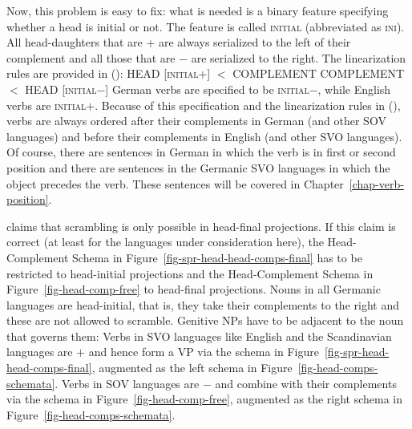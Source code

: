 Now, this problem is easy to fix: what is needed is a binary feature specifying whether a head is
initial or not. The feature is called \textsc{initial} (abbreviated as \textsc{ini}). All
head-daughters that are \ini{}+ are always serialized to the left of their complement and all those
that are \ini{}$-$ are serialized to the right. The linearization rules are provided in ():
\eal
\label{lp-regeln}
\ex HEAD [\textsc{initial}+] $<$ COMPLEMENT
\ex COMPLEMENT $<$  HEAD [\textsc{initial}$-$]
\zl
German verbs are specified to be \textsc{initial}$-$, while English verbs are
\textsc{initial}$+$. Because of this specification and the linearization rules in (), verbs
are always ordered after their complements in German (and other SOV languages) and before their
complements in English (and other SVO languages). Of course, there are sentences in German in which
the verb is in first or second position and there are sentences in the Germanic SVO languages in
which the object precedes the verb. These sentences will be covered in
Chapter~\ref{chap-verb-position}.


\citet[]{Haider2020a} claims that scrambling is only possible in
head-final projections. If this claim is correct (at least for the
languages under consideration here), the Head-Complement Schema in Figure~\ref{fig-spr-head-head-comps-final} has to
be restricted to head-initial projections and the Head-Complement Schema in Figure~\ref{fig-head-comp-free} to
head-final projections. Nouns in all Germanic languages are head-initial, that is, they take their
complements to the right and these are not allowed to scramble. Genitive NPs have to be adjacent to
the noun that governs them:
\eal
{}
\zl
Verbs in SVO languages like English and the Scandinavian languages are \initial $+$ and hence form a
VP via the schema in Figure~\ref{fig-spr-head-head-comps-final}, augmented as the left schema in Figure~\ref{fig-head-comps-schemata}. Verbs in SOV languages are \initial
$-$ and combine with their complements via the schema in Figure~\ref{fig-head-comp-free}, augmented
as the right schema in Figure~\ref{fig-head-comps-schemata}.

